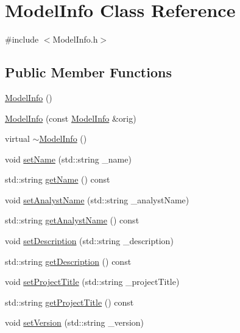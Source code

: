 \hypertarget{class_model_info}{\section{Model\-Info Class Reference}
\label{class_model_info}
}


{\ttfamily \#include $<$Model\-Info.\-h$>$}

\subsection*{Public Member Functions}
\begin{DoxyCompactItemize}
\item 
\hyperlink{class_model_info_ad03680b2c68e69f149052f360bcb7c82}{Model\-Info} ()
\item 
\hyperlink{class_model_info_ad1babe6a54f88ac3a8cadd6ae244ba5a}{Model\-Info} (const \hyperlink{class_model_info}{Model\-Info} \&orig)
\item 
virtual \hyperlink{class_model_info_a91a20ea220fc4d2fd348732b88dbd1b1}{$\sim$\-Model\-Info} ()
\item 
void \hyperlink{class_model_info_a4dba4f92352fa30bf16d73afed5639a2}{set\-Name} (std\-::string \-\_\-name)
\item 
std\-::string \hyperlink{class_model_info_a562466f43f7995be34d74dc6dfd22985}{get\-Name} () const 
\item 
void \hyperlink{class_model_info_a1a88231e60dee818b999ed6680c3319a}{set\-Analyst\-Name} (std\-::string \-\_\-analyst\-Name)
\item 
std\-::string \hyperlink{class_model_info_a9cdad4bf93758de01d5e913f62f1640c}{get\-Analyst\-Name} () const 
\item 
void \hyperlink{class_model_info_aef42873b635386847532290b2dd45e42}{set\-Description} (std\-::string \-\_\-description)
\item 
std\-::string \hyperlink{class_model_info_ad98a56d449f906db347e50bead1f1610}{get\-Description} () const 
\item 
void \hyperlink{class_model_info_a1f9d87d6606b25a8472c67071f03e5a6}{set\-Project\-Title} (std\-::string \-\_\-project\-Title)
\item 
std\-::string \hyperlink{class_model_info_a1995a8639f6c33bff4e31c6b80247bb5}{get\-Project\-Title} () const 
\item 
void \hyperlink{class_model_info_a0e4743250a473b3af22ccefbb57d4a85}{set\-Version} (std\-::string \-\_\-version)
\item 

\end{DoxyCompactItemize}
